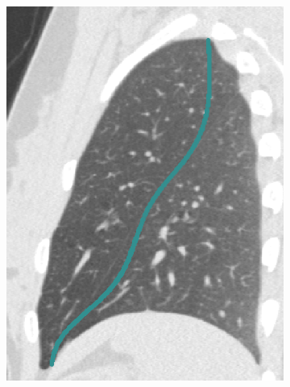{\begin{figure}[htbp]
\begin{subfigure}{.32\linewidth}
  \includegraphics[width=\linewidth,trim={{.0\wd0} {.0\wd0} {.0\wd0} {.0\wd0}},clip]{Segmentation/Image/BeforeChangeSearchRegion.png}
  \caption{}
  \label{fig:SearchRegionControl-a} 
\end{subfigure}
\hspace{.3in} %
\begin{subfigure}{.33\linewidth}%

\end{subfigure}
\end{figure}}
